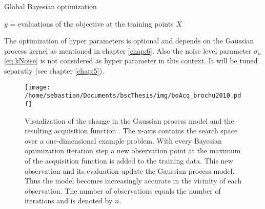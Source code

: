 \begin{algorithm}
    \caption{Global Bayesian optimization\label{alg:boGlob}}
    \BlankLine

    $y$ = evaluations of the objective at the training points $X$\\
\end{algorithm}

The optimization of hyper parameters is optional and depends on the Gaussian process kernel as mentioned in chapter \ref{chap:6}. Also the noise level parameter $\sigma_n$ \eqref{eq:kNoise} is not considered as hyper parameter in this context. It will be tuned separatly (see chapter \ref{chap:5}).

\begin{figure}[h]
    \centering
    \texttt{[image: /home/sebastian/Documents/bscThesis/img/boAcq\_brochu2010.pdf]}
    \caption{Visualization of the change in the Gaussian process model and the resulting acquisition function \cite{brochu2010tutorial}. The x-axis contains the search space over a one-dimensional example problem. With every Bayesian optimization iteration step a new observation point at the maximum of the acquisition function is added to the training data. This new observation and its evaluation update the Gaussian process model. Thus the model becomes increasingly accurate in the vicinity of each observation. The number of observations equals the number of iterations and is denoted by $n$. \label{fig:acqBO}}
\end{figure}

